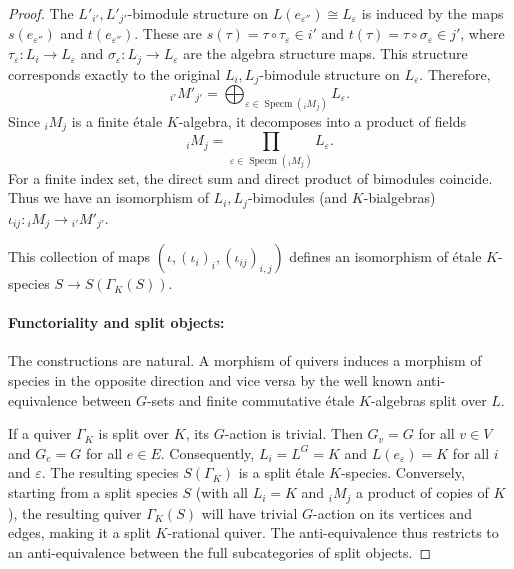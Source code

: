 \documentclass[10pt,a4paper]{amsart}
\DeclareMathOperator{\Specm}{\mathrm{Specm}}
\begin{document}
\begin{proof}
    The $L'_{i'},L'_{j'}$-bimodule structure on $L(e_{\varepsilon''}) \cong L_\varepsilon$ is induced by the maps $s(e_{\varepsilon''})$ and $t(e_{\varepsilon''})$. These are $s(\tau) = \tau\circ\tau_\varepsilon \in i'$ and $t(\tau) = \tau\circ\sigma_\varepsilon \in j'$, where $\tau_\varepsilon: L_i\to L_\varepsilon$ and $\sigma_\varepsilon: L_j\to L_\varepsilon$ are the algebra structure maps. This structure corresponds exactly to the original $L_i,L_j$-bimodule structure on $L_\varepsilon$. Therefore,
    \[
      {}_{i'}M'_{j'} = \bigoplus_{\varepsilon \in \Specm({}_iM_j)} L_\varepsilon.
    \]
    Since ${}_iM_j$ is a finite \'etale $K$-algebra, it decomposes into a product of fields
    \[
      {}_iM_j = \prod\limits_{\varepsilon \in \Specm({}_iM_j)} L_\varepsilon.
    \]
    For a finite index set, the direct sum and direct product of bimodules coincide. Thus we have an isomorphism of $L_i,L_j$-bimodules (and $K$-bialgebras) $\iota_{ij}\colon {}_iM_j \to {}_{i'}M'_{j'}$.
    
    This collection of maps $(\iota, (\iota_i)_i, (\iota_{ij})_{i,j})$ defines an isomorphism of \'etale $K$-species $S \to S(\Gamma_K(S))$.
    
    \paragraph{Functoriality and split objects:} The constructions are natural. A morphism of quivers induces a morphism of species in the opposite direction and vice versa by the well known anti-equivalence between $G$-sets and finite commutative \'etale $K$-algebras split over $L$.
    
    If a quiver $\Gamma_K$ is split over $K$, its $G$-action is trivial. Then $G_v=G$ for all $v\in V$ and $G_e=G$ for all $e\in E$. Consequently, $L_i=L^G=K$ and $L(e_\varepsilon)=K$ for all $i$ and $\varepsilon$. The resulting species $S(\Gamma_K)$ is a split \'etale $K$-species. Conversely, starting from a split species $S$ (with all $L_i=K$ and ${}_iM_j$ a product of copies of $K$), the resulting quiver $\Gamma_K(S)$ will have trivial $G$-action on its vertices and edges, making it a split $K$-rational quiver. The anti-equivalence thus restricts to an anti-equivalence between the full subcategories of split objects.
  \end{proof}
\end{document}
